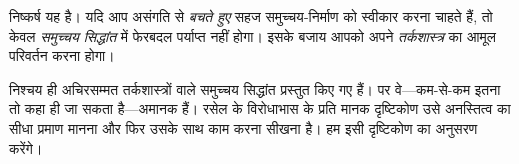 \documentclass[../../../include/open-logic-section]{subfiles}
\begin{document}
निष्कर्ष यह है। यदि आप असंगति से \emph{बचते हुए} सहज समुच्चय-निर्माण को
स्वीकार करना चाहते हैं, तो केवल \emph{समुच्चय सिद्धांत} में फेरबदल पर्याप्त
नहीं होगा। इसके बजाय आपको अपने \emph{तर्कशास्त्र} का आमूल परिवर्तन करना
होगा।

निश्चय ही अचिरसम्मत तर्कशास्त्रों वाले समुच्चय सिद्धांत प्रस्तुत किए गए हैं।
पर वे---कम-से-कम इतना तो कहा ही जा सकता है---अमानक हैं। रसेल के विरोधाभास
के प्रति मानक दृष्टिकोण उसे अनस्तित्व का सीधा प्रमाण मानना और फिर उसके साथ
काम करना सीखना है। हम इसी दृष्टिकोण का अनुसरण करेंगे।
\end{document}
